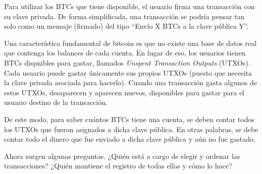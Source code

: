 %
Para utilizar los BTCs que tiene disponible, el usuario firma una transacción con su clave privada.
%
De forma simplificada, una transacción se podría pensar tan solo como un mensaje (firmado) del tipo
\textquotedblleft Envío X BTCs a la clave pública Y\textquotedblright.

Una característica fundamental de bitcoin es que no existe una base de datos real que contenga los
balances de cada cuenta.
%
En lugar de eso, los usuarios tienen BTCs dispnibles para gastar, llamados
\textit{Unspent Transaction Outputs} (UTXOs).
%
Cada usuario puede gastar únicamente sus propios UTXOs
(puesto que necesita la clave privada asociada para hacerlo).
%
Cuando una transacción gasta algunos de estos UTXOs, desaparecen y aparecen nuevos,
disponibles para gastar para el usuario destino de la transacción.
%

De este modo, para saber cuántos BTCs tiene una cuenta, se deben contar todos los UTXOs que fueron
asignados a dicha clave pública.
%
En otras palabras, se debe contar todo el dinero que fue enviado a dicha clave pública y aún no
fue gastado.

Ahora surgen algunas preguntas. ¿Quién está a cargo de elegir y ordenar las transacciones?
¿Quién mantiene el registro de todas ellas y cómo lo hace?



